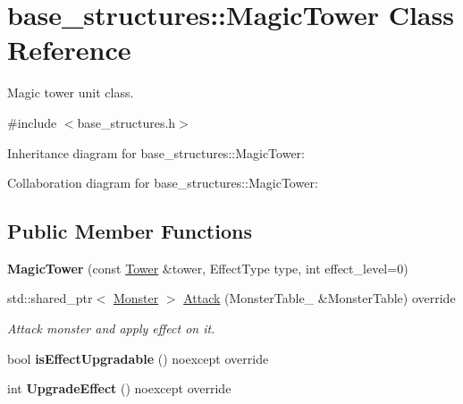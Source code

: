 \hypertarget{classbase__structures_1_1MagicTower}{}\section{base\+\_\+structures\+:\+:Magic\+Tower Class Reference}
\label{classbase__structures_1_1MagicTower}


Magic tower unit class.  




{\ttfamily \#include $<$base\+\_\+structures.\+h$>$}



Inheritance diagram for base\+\_\+structures\+:\+:Magic\+Tower\+:


Collaboration diagram for base\+\_\+structures\+:\+:Magic\+Tower\+:
\subsection*{Public Member Functions}
\begin{DoxyCompactItemize}
\item 
\mbox{\label{classbase__structures_1_1MagicTower_a7828eb5352ab72a7415b64cc77933215}} 
{\bfseries Magic\+Tower} (const \hyperlink{classbase__structures_1_1Tower}{Tower} \&tower, Effect\+Type type, int effect\+\_\+level=0)
\item 
\mbox{\label{classbase__structures_1_1MagicTower_a8602aa6fe28a969230079369c4c71efc}} 
std\+::shared\+\_\+ptr$<$ \hyperlink{classbase__structures_1_1Monster}{Monster} $>$ \hyperlink{classbase__structures_1_1MagicTower_a8602aa6fe28a969230079369c4c71efc}{Attack} (Monster\+Table\+\_\+ \&Monster\+Table) override
\begin{DoxyCompactList}\small\item\em Attack monster and apply effect on it. \end{DoxyCompactList}\item 
\mbox{\label{classbase__structures_1_1MagicTower_aad0b722acdbaadcc32da46c23f8ad9b7}} 
bool {\bfseries is\+Effect\+Upgradable} () noexcept override
\item 
\mbox{\label{classbase__structures_1_1MagicTower_a07c6537b3158bbfd3163e35824b44530}} 
int {\bfseries Upgrade\+Effect} () noexcept override
\end{DoxyCompactItemize}
